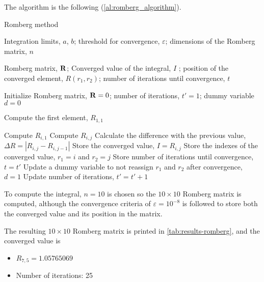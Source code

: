 The algorithm is the following (\cref{al:romberg_algorithm}).
\begin{algorithm}
    \caption{Romberg method}\label{al:romberg_algorithm}
    \begin{algorithmic}[1]

        \Input Integration limits, $a$, $b$;
        threshold for convergence, $\varepsilon$;
        dimensions of the Romberg matrix, $n$

        \Output Romberg matrix, $\boldsymbol{\mathrm{R}}$;
        Converged value of the integral, $I$ ;
        position of the converged element, $R\left( r_1, r_2 \right)$;
        number of iterations until convergence, $t$

        \State Initialize Romberg matrix, $\boldsymbol{\mathrm{R}} = 0$; 
        number of iterations, $t' = 1$;
        dummy variable $d = 0$

        \State Compute the first element, $R_{1,1}$

            \State Compute $R_{i, 1}$
                \State Compute $R_{i, j}$
                \State Calculate the difference with the previous value,
                $\Delta R = \left| R_{i,j} - R_{i,j-1} \right|$
                    \State Store the converged value, $I = R_{i,j}$
                    \State Store the indexes of the converged value, $r_1 = i$
                    and $r_2 = j$ 
                    \State Store number of iterations until convergence, $t = t'$
                    \State Update a dummy variable to not reassign 
                    $r_1$ and $r_2$ after convergence, $d = 1$
                \EndIf
                \State Update number of iterations, $t' = t' + 1$
            \EndFor
        \EndFor

        \EndProcedure
    \end{algorithmic}
\end{algorithm}

To compute the integral, $n = 10$ is chosen so the $10\times 10$ Romberg matrix is
computed, although the convergence criteria of $\varepsilon = 10^{-8}$ is followed
to store both the converged value and its position in the matrix.

The resulting $10\times 10$ Romberg matrix is printed in \cref{tab:results-romberg},
and the converged value is
\begin{itemize}
    \item $R_{7,5} = 1.05765069$
    \item Number of iterations: 25
\end{itemize}

